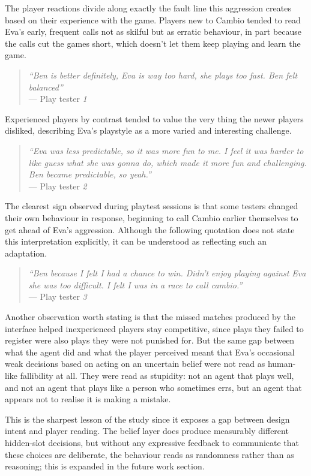 \documentclass[12pt,a4paper,oneside]{report}
\begin{document}
The player reactions divide along exactly the fault line this aggression creates based on their experience with the game. Players new to Cambio tended to read Eva's early, frequent calls not as skilful but as erratic behaviour, in part because the calls cut the games short, which doesn't let them keep playing and learn the game.
\begin{quote}
\textit{``Ben is better definitely, Eva is way too hard, she plays too fast. Ben felt balanced''} \\
\hfill --- Play tester \emph{1}
\end{quote}
Experienced players by contrast tended to value the very thing the newer players disliked, describing Eva's playstyle as a more varied and interesting challenge.
\begin{quote}
\textit{``Eva was less predictable, so it was more fun to me. I feel it was harder to like guess what she was gonna do, which made it more fun and challenging. Ben became predictable, so yeah.''} \\
\hfill --- Play tester \emph{2} 
\end{quote}

The clearest sign observed during playtest sessions is that some testers changed their own behaviour in response, beginning to call Cambio earlier themselves to get ahead of Eva's aggression. Although the following quotation does not state this interpretation explicitly, it can be understood as reflecting such an adaptation.
\begin{quote}
\textit{``Ben because I felt I had a chance to win. Didn't enjoy playing against Eva she was too difficult. I felt I was in a race to call cambio.''} \\
\hfill --- Play tester \emph{3}
\end{quote}

Another observation worth stating is that the missed matches produced by the interface helped inexperienced players stay competitive, since plays they failed to register were also plays they were not punished for. But the same gap between what the agent did and what the player perceived meant that Eva's occasional weak decisions based on acting on an uncertain belief were not read as human-like fallibility at all. They were read as stupidity: not an agent that plays well, and not an agent that plays like a person who sometimes errs, but an agent that appears not to realise it is making a mistake.

This is the sharpest lesson of the study since it exposes a gap between design intent and player reading. The belief layer does produce measurably different hidden-slot decisions, but without any expressive feedback to communicate that these choices are deliberate, the behaviour reads as randomness rather than as reasoning; this is expanded in the future work section.
\end{document}
